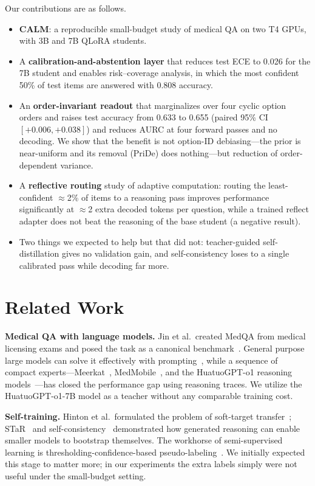 \documentclass[conference]{IEEEtran}
\begin{document}
Our contributions are as follows.
\begin{itemize}
\item \textbf{CALM}: a reproducible small-budget study of medical QA on two T4 GPUs, with 3B and 7B QLoRA students.
\item A \textbf{calibration-and-abstention layer} that reduces test ECE to 0.026 for the 7B student and enables risk--coverage analysis, in which the most confident 50\% of test items are answered with 0.808 accuracy.
\item An \textbf{order-invariant readout} that marginalizes over four cyclic option orders and raises test accuracy from 0.633 to 0.655 (paired 95\% CI $[+0.006,+0.038]$) and reduces AURC at four forward passes and no decoding. We show that the benefit is not option-ID debiasing---the prior is near-uniform and its removal (PriDe) does nothing---but reduction of order-dependent variance.
\item A \textbf{reflective routing} study of adaptive computation: routing the least-confident $\approx$2\% of items to a reasoning pass improves performance significantly at $\approx$2 extra decoded tokens per question, while a trained reflect adapter does not beat the reasoning of the base student (a negative result).
\item Two things we expected to help but that did not: teacher-guided self-distillation gives no validation gain, and self-consistency loses to a single calibrated pass while decoding far more.
\end{itemize}

\section{Related Work}
\textbf{Medical QA with language models.} Jin et al.\ created MedQA from medical licensing exams and posed the task as a canonical benchmark~\cite{medqa}. General purpose large models can solve it effectively with prompting~\cite{gpt4med,medpalm}, while a sequence of compact experts---Meerkat~\cite{meerkat}, MedMobile~\cite{medmobile}, and the HuatuoGPT-o1 reasoning models~\cite{huatuo}---has closed the performance gap using reasoning traces. We utilize the HuatuoGPT-o1-7B model as a teacher without any comparable training cost.

\textbf{Self-training.} Hinton et al.\ formulated the problem of soft-target transfer~\cite{hinton}; STaR~\cite{star} and self-consistency~\cite{selfconsistency} demonstrated how generated reasoning can enable smaller models to bootstrap themselves. The workhorse of semi-supervised learning is thresholding-confidence-based pseudo-labeling~\cite{pseudolabel}. We initially expected this stage to matter more; in our experiments the extra labels simply were not useful under the small-budget setting.
\end{document}
